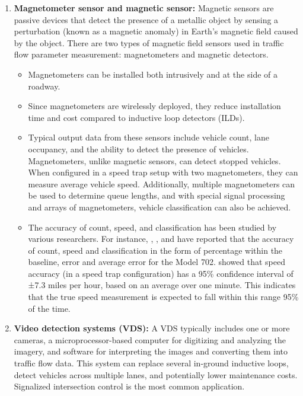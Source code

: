 \begin{enumerate}
    \item \textbf{Magnetometer sensor and magnetic sensor:} Magnetic sensors are passive devices that detect the presence of a metallic object by sensing a perturbation (known as a magnetic anomaly) in Earth's magnetic field caused by the object. There are two types of magnetic field sensors used in traffic flow parameter measurement: magnetometers and magnetic detectors.
    \begin{itemize}
        \item Magnetometers can be installed both intrusively and at the side of a roadway.
        \item Since magnetometers are wirelessly deployed, they reduce installation time and cost compared to inductive loop detectors (ILDs).
        \item Typical output data from these sensors include vehicle count, lane occupancy, and the ability to detect the presence of vehicles. Magnetometers, unlike magnetic sensors, can detect stopped vehicles. When configured in a speed trap setup with two magnetometers, they can measure average vehicle speed. Additionally, multiple magnetometers can be used to determine queue lengths, and with special signal processing and arrays of magnetometers, vehicle classification can also be achieved.
        \item The accuracy of count, speed, and classification has been studied by various researchers. For instance, \textcite{middleton2000initial}, \textcite{minge2010evaluation},\textcite{minge2011evaluation} and \textcite{grone2012evaluation} have reported that the accuracy of count, speed and classification in the form of percentage within the baseline, error and average error for the Model 702. \textcite{middleton2000initial} showed that speed accuracy (in a speed trap configuration) has a 95\% confidence interval of ±7.3 miles per hour, based on an average over one minute. This indicates that the true speed measurement is expected to fall within this range 95\% of the time.
    \end{itemize}
    \item \textbf{Video detection systems (VDS):} A VDS typically includes one or more cameras, a microprocessor-based computer for digitizing and analyzing the imagery, and software for interpreting the images and converting them into traffic flow data. This system can replace several in-ground inductive loops, detect vehicles across multiple lanes, and potentially lower maintenance costs. Signalized intersection control is the most common application.

\end{enumerate}
